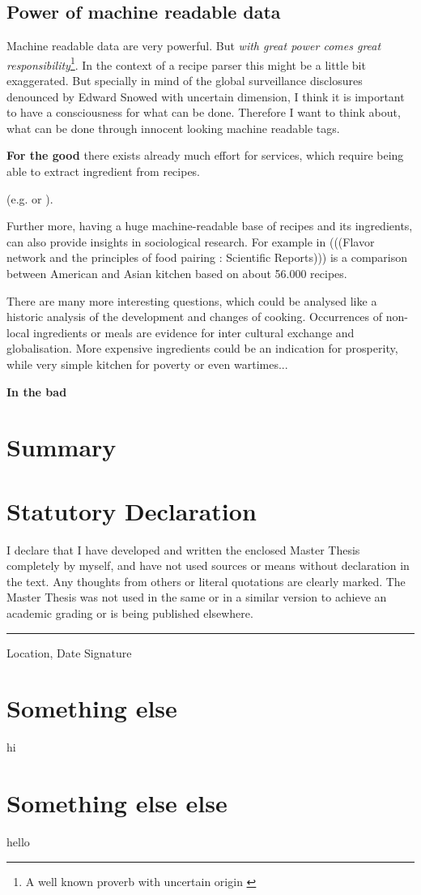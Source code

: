 \documentclass[12pt, twoside]{report}
\begin{document}
\section{Power of machine readable data}
Machine readable data are very powerful. But \textit{with great power comes great responsibility}\footnote{A well known proverb with uncertain origin \parencite{quoteInvestigator}}. In the context of a recipe parser this might be a little bit exaggerated. But specially in mind of the global surveillance disclosures denounced by Edward Snowed with uncertain dimension, I think it is important to have a consciousness for what can be done. Therefore I want to think about, what can be done through innocent looking machine readable tags. 
\bigskip

\textbf{For the good} there exists already much effort for services, which require being able to extract ingredient from recipes.

 (e.g. \cite{ingredientNetworks} or \cite{recipeRecommendation}).

Further more, having a huge machine-readable base of recipes and its ingredients, can also provide insights in sociological research. For example in (((Flavor network and the principles of food pairing : Scientific Reports))) is a comparison between American and Asian kitchen based on about 56.000 recipes.

There are many more interesting questions, which could be analysed like a historic analysis of the development and changes of cooking. Occurrences of non-local ingredients or meals are evidence for inter cultural exchange and globalisation. More expensive ingredients could be an indication for prosperity, while very simple kitchen for poverty or even wartimes...
\bigskip

\textbf{In the bad} \parencite{clintonHealth}


\chapter{Summary}


\appendix
\chapter{Statutory Declaration}
I declare that I have developed and written the enclosed Master Thesis completely by myself, and have not used sources or means without declaration in the text. Any thoughts from others or literal quotations are clearly marked. The Master Thesis was not used in the same or in a similar version to achieve an academic grading or is being published elsewhere.
\newline
\newline
\newline
\rule{\textwidth}{1pt}
Location, Date \hfill Signature 

\chapter{Something else}
hi

\chapter{Something else else}
hello

\printbibliography
\end{document}
